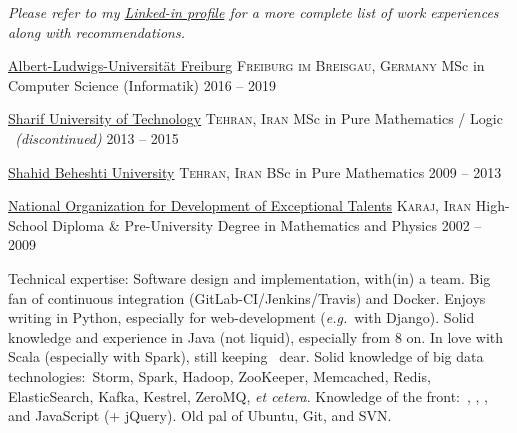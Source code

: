\documentclass[10pt,a4paper]{article}
\begin{document}
\vspace{-0.2em}
\begin{center}
  \emph{\small Please refer to my \href{http://www.linkedin.com/in/angellandros}{Linked-in profile} for a more complete list of work experiences along with recommendations.}
\end{center}

\spacedhrule{-0.2em}{-0.4em}


\headedsection
  {\href{http://www.uni-freiburg.de/}{Albert-Ludwigs-Universität Freiburg}}
  {\textsc{Freiburg im Breisgau, Germany}} {%
  \headedsubsection
    {MSc in Computer Science (Informatik)}
    {2016 -- 2019}
    {}
}

\headedsection
  {\href{http://www.en.sharif.edu/}{Sharif University of Technology}}
  {\textsc{Tehran, Iran}} {%
  \headedsubsection
    {MSc in Pure Mathematics / Logic \textnormal{\textit{~(discontinued)}}}
    {2013 -- 2015} 
    {}
}

\headedsection
  {\href{http://en.sbu.ac.ir/}{Shahid Beheshti University}}
  {\textsc{Tehran, Iran}} {%
  \headedsubsection
    {BSc in Pure Mathematics}
    {2009 -- 2013} 
    {}
}

\headedsection
  {\href{https://en.wikipedia.org/wiki/National_Organization_for_Development_of_Exceptional_Talents}{National Organization for Development of Exceptional Talents}}
  {\textsc{Karaj, Iran}} {%
  \headedsubsection
    {High-School Diploma \& Pre-University Degree in Mathematics and Physics}
    {2002 -- 2009} {}
}


\spacedhrule{0.5em}{-0.4em}


\inlineheadsection  %
  {Technical expertise:}
  {Software design and implementation, with(in) a team.  Big fan of continuous integration (GitLab-CI/Jenkins/Travis) and Docker.  Enjoys writing in Python, especially for web-development (\textit{e.g.}\ with Django). Solid knowledge and experience in Java (not liquid), especially from 8 on. In love with Scala (especially with Spark), still keeping \CPP\ dear. Solid knowledge of big data technologies:\ Storm, Spark, Hadoop, ZooKeeper, Memcached, Redis, ElasticSearch, Kafka, Kestrel, ZeroMQ, \textit{et cetera}. Knowledge of the front:\ , , , and JavaScript (+ jQuery). Old pal of Ubuntu, Git, and SVN.}
\end{document}
